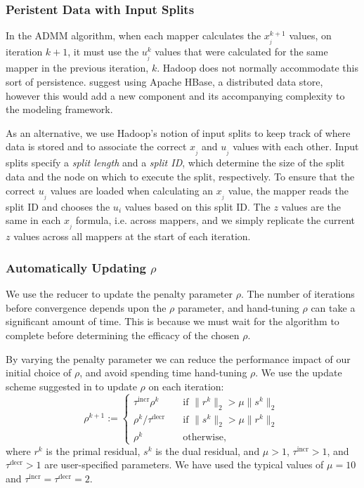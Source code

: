\documentclass[10pt, conference, compsocconf]{IEEEtran}
\begin{document}
\subsubsection{Peristent Data with Input Splits}
In the ADMM algorithm, when each mapper calculates the $x_{_j}^{k+1}$ values, on iteration $k+1$, it must use the $u_{_j}^k$ values that were calculated for the same mapper in the previous iteration, $k$.  Hadoop does not normally accommodate this sort of persistence.  \cite{boyd} suggest using Apache HBase, a distributed data store, however this would add a new component and its accompanying complexity to the modeling framework.

As an alternative, we use Hadoop's notion of input splits to keep track of where data is stored and to associate the correct $x_{_j}$ and $u_{_j}$ values with each other.  Input splits specify a \emph{split length} and a \emph{split ID}, which determine the size of the split data and the node on which to execute the split, respectively.  To ensure that the correct $u_{_j}$ values are loaded when calculating an $x_{_j}$ value, the mapper reads the split ID and chooses the $u_i$ values based on this split ID.  The $z$ values are the same in each $x_{_j}$ formula, i.e. across mappers, and we simply replicate the current $z$ values across all mappers at the start of each iteration.

\subsubsection{Automatically Updating $\rho$}

We use the reducer to update the penalty parameter $\rho$.  The number of iterations before convergence depends upon the $\rho$ parameter, and hand-tuning $\rho$ can take a significant amount of time.  This is because we must wait for the algorithm to complete before determining the efficacy of the chosen $\rho$.

By varying the penalty parameter we can reduce the performance impact of our initial choice of $\rho$, and avoid spending time hand-tuning $\rho$.  We use the update scheme suggested in \cite{boyd} to update $\rho$ on each iteration:
\begin{equation}
\rho^{k+1}:=\begin{cases}
  \tau^{\text{incr}}\rho^k&\quad \text{if $\|r^k\|_2>\mu\|s^k\|_2$}\\
  \rho^k/\tau^{\text{decr}}&\quad \text{if $\|s^k\|_2>\mu\|r^k\|_2$}\\
  \rho^k&\quad \text{otherwise,}
\end{cases}
\label{eq:r}
\end{equation}
where $r^k$ is the primal residual, $s^k$ is the dual residual, and $\mu>1$, $\tau^{\text{incr}}>1$, and $\tau^{\text{decr}}>1$ are user-specified parameters.  We have used the typical values of $\mu=10$ and $\tau^{\text{incr}}=\tau^{\text{decr}}=2$.
\end{document}
